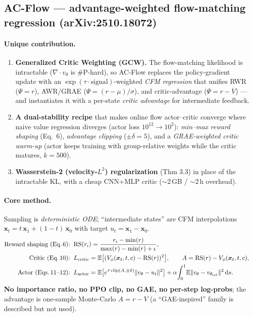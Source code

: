 \documentclass[11pt]{article}
\theoremstyle{remark}
\newcommand{\xt}{\bm{x}}
\newcommand{\E}{\mathbb{E}}
\newcommand{\Vphi}{V_\phi}
\begin{document}
\subsection{AC-Flow --- advantage-weighted flow-matching regression (arXiv:2510.18072)}
\label{sec:acflow}

\paragraph{Unique contribution.}
\begin{enumerate}[leftmargin=1.6em]
  \item \textbf{Generalized Critic Weighting (GCW).} The flow-matching likelihood is
  intractable ($\nabla\!\cdot v_\theta$ is \#P-hard), so AC-Flow replaces the
  policy-gradient update with an $\exp(\tau\cdot\text{signal})$-weighted \emph{CFM
  regression} that unifies RWR ($\Psi{=}r$), AWR/GRAE ($\Psi{=}(r{-}\mu)/\sigma$), and
  critic-advantage ($\Psi{=}r{-}V$) --- and instantiates it with a per-state
  \emph{critic advantage} for intermediate feedback.
  \item \textbf{A dual-stability recipe} that makes online flow actor--critic converge
  where naive value regression diverges (actor loss $10^{12}\!\to\!10^2$):
  \emph{min--max reward shaping} (Eq.\ 6), \emph{advantage clipping} ($\pm\delta{=}5$),
  and a \emph{GRAE-weighted critic warm-up} (actor keeps training with group-relative
  weights while the critic matures, $k{=}500$).
  \item \textbf{Wasserstein-2 (velocity-$L^2$) regularization} (Thm 3.3) in place of
  the intractable KL, with a cheap CNN+MLP critic ($\sim$2\,GB / $\sim$2\,h overhead).
\end{enumerate}

\paragraph{Core method.}
Sampling is \emph{deterministic ODE}; ``intermediate states'' are CFM interpolations
$\xt_t=t\,\xt_1+(1-t)\,\xt_0$ with target $u_t=\xt_1-\xt_0$.
\begin{align}
\text{Reward shaping (Eq.\,6):}\;\;
  &\mathrm{RS}(r_i)=\frac{r_i-\min(r)}{\max(r)-\min(r)+\epsilon}, \\
\text{Critic (Eq.\,10):}\;\;
  &L_{\mathrm{critic}}=\E\big[(\Vphi(\xt_t,t,c)-\mathrm{RS}(r))^2\big],
   \qquad A=\mathrm{RS}(r)-\Vphi(\xt_t,t,c), \\
\text{Actor (Eqs.\,11--12):}\;\;
  &L_{\mathrm{actor}}=\E\big[e^{\tau\,\mathrm{clip}(A,\pm\delta)}\lVert v_\theta-u_t\rVert^2\big]
   +\alpha\!\int_0^1\!\E\lVert v_\theta-v_{\theta_{\mathrm{ref}}}\rVert^2\,\mathrm ds.
\end{align}
\textbf{No importance ratio, no PPO clip, no GAE, no per-step log-probs}; the advantage
is one-sample Monte-Carlo $A=r-V$ (a ``GAE-inspired'' family is described but not used).
\end{document}
